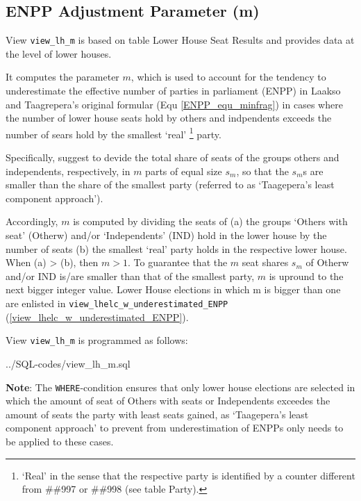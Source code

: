 \subsection{ENPP Adjustment Parameter (m)}\label{view_lh_m}
View \texttt{\footnotesize view\_lh\_m} is based on table Lower House Seat Results and provides data at the level of lower houses.

It computes the parameter $m$, which is used to account for the tendency to underestimate the effective number of parties in parliament (ENPP) in Laakso and Taagrepera's original formular (Equ \ref{ENPP_equ_minfrag}) 
in cases where the number of lower house seats hold by others and indpendents exceeds the number of sears hold by the smallest `real' \footnote{`Real' in the sense that the respective party is identified by a counter different from \#\#997 or \#\#998 (see table Party).} party.

Specifically, \citet[pp.\,600-602]{Gallagher&Mitchell2005} suggest to devide the total share of seats of the groups others and independents, respectively, in $m$ parts of equal size $s_{m}$, so that the $s_{m}$s are smaller than the share of the smallest party (referred to as `Taagepera's least component approach').

Accordingly, $m$ is computed by dividing the seats of (a) the groups `Others with seat' (Otherw) and/or `Independents' (IND) hold in the lower house by the number of seats (b) the smallest 
`real' party holds in the respective lower house.
When (a) > (b), then $m > 1$.
To guarantee that the $m$ seat shares $s_{m}$ of Otherw and/or IND is/are smaller than that of the smallest party, $m$ is upround to the next bigger integer value.
Lower House elections in which m is bigger than one are enlisted in \texttt{\footnotesize view\_lhelc\_w\_underestimated\_ENPP} (\ref{view_lhelc_w_underestimated_ENPP}).


View \texttt{\footnotesize view\_lh\_m} is programmed as follows:

%
{../SQL-codes/view_lh_m.sql}

{\bf Note}: The \texttt{\footnotesize WHERE}-condition ensures that only lower house elections are selected in which the amount of seat of Others with seats or Independents exceedes the amount of seats the party with least seats gained, as `Taagepera's least component approach' to prevent from underestimation of ENPPs only needs to be applied to these cases.

